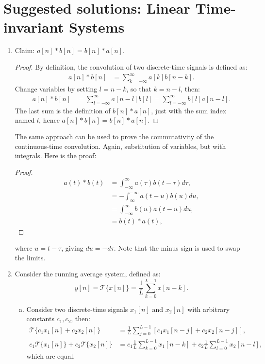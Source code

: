 
\newpage
\section{Suggested solutions: Linear Time-invariant Systems}
\begin{enumerate}

  \item Claim: $a[n]*b[n]=b[n]*a[n]$.
        \begin{proof}
          By definition, the convolution of two discrete-time signals is defined as:
          \begin{align*}
            a[n]*b[n] & =\sum_{k=-\infty}^{\infty} a[k]b[n-k].
          \end{align*}
          Change variables by setting $l=n-k$, so that $k=n-l$, then:
          \begin{align*}
            a[n]*b[n] & =\sum_{l=-\infty}^{\infty}a[n-l]b[l]=\sum_{l=-\infty}^{\infty}b[l]a[n-l].
          \end{align*}
          The last sum is the definition of $b[n]*a[n]$, just with the sum index named $l$, hence $a[n]*b[n]=b[n]*a[n]$.
        \end{proof}
        The same approach can be used to prove the commutativity of the continuous-time convolution.
        Again, substitution of variables, but with integrals. Here is the proof:
        \begin{proof}
          \begin{align*}
            a(t)*b(t) & = \int_{-\infty}^{\infty}a(\tau)b(t-\tau)d\tau, \\
                      & = -\int_{\infty}^{-\infty}a(t-u)b(u)du,         \\
                      & = \int_{-\infty}^{\infty}b(u)a(t-u)du,          \\
                      & = b(t) * a(t),
          \end{align*}
        \end{proof}
        where $u=t-\tau$, giving $du=-d\tau$. Note that the minus sign is used to swap the limits.

  \item Consider the running average system, defined as:
        \[ y[n]=\mathcal{T}\{x[n]\}=\frac{1}{L}\sum_{k=0}^{L-1}x[n-k]. \]

        \begin{enumerate}[a)]
          \item Consider two discrete-time signals $x_{1}[n]$ and $x_{2}[n]$ with
                arbitrary constants $c_{1},c_{2}$, then:
                \begin{align*}
                  \mathcal{T}\{c_{1}x_{1}[n]+c_{2}x_{2}[n]\}                & =\frac{1}{L}\sum_{j=0}^{L-1}[c_{1}x_{1}[n-j]+c_{2}x_{2}[n-j]],                          \\
                  c_{1}\mathcal{T}\{x_{1}[n]\}+c_{2}\mathcal{T}\{x_{2}[n]\} & =c_{1}\frac{1}{L}\sum_{k=0}^{L-1}x_{1}[n-k]+c_{2}\frac{1}{L}\sum_{l=0}^{L-1}x_{2}[n-l],
                \end{align*}
                which are equal.


\end{enumerate}
\end{enumerate}
